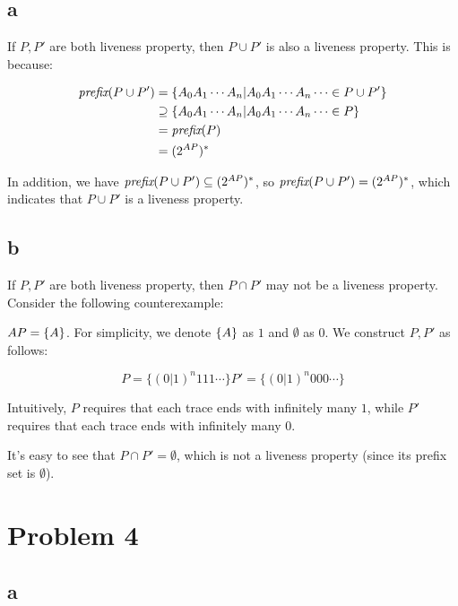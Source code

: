 \subsection{a}

If $P, P'$ are both liveness property, then $P \cup P'$ is also a liveness property.
This is because:

$$
\begin{aligned}
    \textit{prefix}(P \cup P')
    &= \{ A_0 A_1 \cdots A_n | A_0 A_1 \cdots A_n \cdots \in P \cup P' \} \\
    &\supseteq \{ A_0 A_1 \cdots A_n | A_0 A_1 \cdots A_n \cdots \in P \} \\
    &= \textit{prefix}(P) \\
    &= (2^{AP})^* \\
\end{aligned}
$$

In addition, we have $\textit{prefix}(P \cup P') \subseteq (2^{AP})^*$, so $\textit{prefix}(P \cup P') = (2^{AP})^*$,
which indicates that $P \cup P'$ is a liveness property.

\subsection{b}

If $P, P'$ are both liveness property, then $P \cap P'$ may not be a liveness property.
Consider the following counterexample:

$AP = \{A\}$. For simplicity, we denote $\{A\}$ as $1$ and $\emptyset$ as $0$. We construct $P, P'$ as follows:

$$
P  = \{ (0 | 1)^n 1 1 1 \cdots \}
P' = \{ (0 | 1)^n 0 0 0 \cdots \}
$$

Intuitively, $P$ requires that each trace ends with infinitely many $1$,
while $P'$ requires that each trace ends with infinitely many $0$.

It's easy to see that $P \cap P' = \emptyset$, which is not a liveness property
(since its prefix set is $\emptyset$).

\section{Problem 4}

\subsection{a}

\newcommand{\aaa}{\{\alpha\}}
\newcommand{\bb}{\{\beta\}}
\newcommand{\ee}{\{\eta\}}
\newcommand{\Act}{\textit{Act}}

